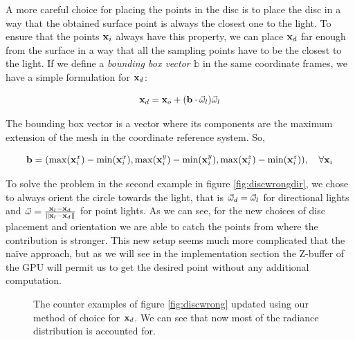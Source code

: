 A more careful choice for placing the points in the disc is to place the disc in a way that the obtained surface point is always the closest one to the light. To ensure that the points $\mathbf{x}_i$ always have this property, we can place $\mathbf{x}_d$ far enough from the surface in a way that all the sampling points have to be the closest to the light. If we define a \emph{bounding box vector} $\mathbb{b}$ in the same coordinate frames, we have a simple formulation for $\mathbf{x}_d$:

$$
\mathbf{x}_d = \mathbf{x}_o + (\mathbf{b} \cdot \vec{\omega}_l) \vec{\omega}_l
$$

The bounding box vector is a vector where its components are the maximum extension of the mesh in the coordinate reference system. So,

$$
\mathbf{b} = (\max(\mathbf{x}_i^x) - \min(\mathbf{x}_i^x), \max(\mathbf{x}_i^y) - \min(\mathbf{x}_i^y), \max(\mathbf{x}_i^z) - \min(\mathbf{x}_i^z)), \ \ \ \forall \mathbf{x}_i
$$ 

To solve the problem in the second example in figure \ref{fig:discwrongdir}, we chose to always orient the circle towards the light, that is $\vec{\omega}_d = \vec{\omega}_l$ for directional lights and $\vec{\omega} = \frac{\mathbf{x}_l - \mathbf{x}_d}{\|\mathbf{x}_l - \mathbf{x}_d\|}$ for point lights. As we can see, for the new choices of disc placement and orientation we are able to catch the points from where the contribution is stronger. This new setup seems much more complicated that the na\"{i}ve approach, but as we will see in the implementation section the Z-buffer of the GPU will permit us to get the desired point without any additional computation.

\begin{figure}
\centering
{}
\label{fig:discright}
\caption{The counter examples of figure \ref{fig:discwrong} updated using our method of choice for $\mathbf{x}_d$. We can see that now most of the radiance distribution is accounted for.}
\end{figure}

